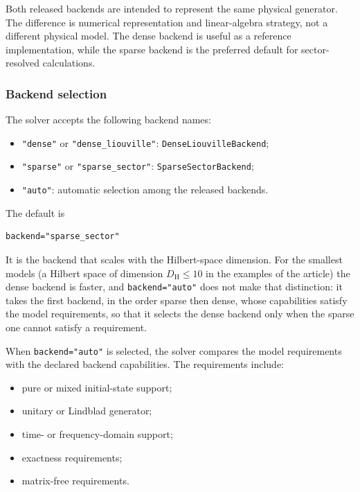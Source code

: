 \documentclass[11pt]{article}
\begin{document}
Both released backends are intended to represent the same physical generator.
The difference is numerical representation and linear-algebra strategy, not a
different physical model. The dense backend is useful as a reference
implementation, while the sparse backend is the preferred default for
sector-resolved calculations.

\subsubsection*{Backend selection}

The solver accepts the following backend names:

\begin{itemize}
    \item \texttt{"dense"} or \texttt{"dense\_liouville"}:
    \texttt{DenseLiouvilleBackend};
    \item \texttt{"sparse"} or \texttt{"sparse\_sector"}:
    \texttt{SparseSectorBackend};
    \item \texttt{"auto"}: automatic selection among the released backends.
\end{itemize}

The default is

\begin{verbatim}
backend="sparse_sector"
\end{verbatim}

It is the backend that scales with the Hilbert-space dimension. For the smallest
models (a Hilbert space of dimension $D_{\mathrm{H}}\leq10$ in the examples of the
article) the dense backend is faster, and \texttt{backend="auto"} does not make
that distinction: it takes the first backend, in the order sparse then dense,
whose capabilities satisfy the model requirements, so that it selects the dense
backend only when the sparse one cannot satisfy a requirement.

When \texttt{backend="auto"} is selected, the solver compares the model
requirements with the declared backend capabilities. The requirements include:

\begin{itemize}
    \item pure or mixed initial-state support;
    \item unitary or Lindblad generator;
    \item time- or frequency-domain support;
    \item exactness requirements;
    \item matrix-free requirements.
\end{itemize}
\end{document}
